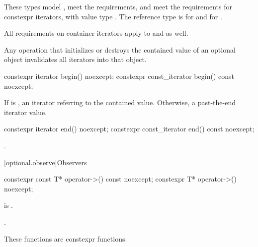 \begin{itemdescr}
\pnum
These types
model ,
meet the  requirements, and
meet the requirements for constexpr iterators,
with value type .
The reference type is  for  and
 for .

\pnum
All requirements on container iterators apply to
 and  as well.

\pnum
Any operation that initializes or destroys the contained value of an optional object invalidates all iterators into that object.
\end{itemdescr}

%
\begin{itemdecl}
constexpr iterator begin() noexcept;
constexpr const_iterator begin() const noexcept;
\end{itemdecl}

\begin{itemdescr}
\pnum
\returns
If  is ,
an iterator referring to the contained value.
Otherwise, a past-the-end iterator value.
\end{itemdescr}

%
\begin{itemdecl}
constexpr iterator end() noexcept;
constexpr const_iterator end() const noexcept;
\end{itemdecl}

\begin{itemdescr}
\pnum
\returns
{}.
\end{itemdescr}

[optional.observe]{Observers}

%
\begin{itemdecl}
constexpr const T* operator->() const noexcept;
constexpr T* operator->() noexcept;
\end{itemdecl}

\begin{itemdescr}
\pnum
\hardexpects
{} is .

\pnum
\returns
{}.

\pnum
\remarks
These functions are constexpr functions.
\end{itemdescr}

